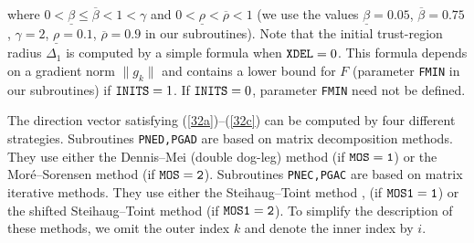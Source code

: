 \documentclass{esub2acm}
\begin{document}
%
where $0 < \underline{\beta} \leq \overline{\beta} < 1 < \gamma$
and $0 < \underline{\rho} < \overline{\rho} < 1$ (we use the values
$\underline{\beta} = 0.05$, $\overline{\beta} = 0.75$, $\gamma = 2$,
$\underline{\rho} = 0.1$, $\overline{\rho} = 0.9$ in our subroutines).
Note that the initial trust-region radius $\Delta_1$ is computed
by a simple formula when ${\tt XDEL} = 0$. This formula depends on
a gradient norm $\|g_k\|$ and contains a lower bound for $F$ (parameter
{\tt FMIN} in our subroutines) if ${\tt INITS}=1$. If ${\tt INITS}=0$,
parameter {\tt FMIN} need not be defined.

The direction vector satisfying (\ref{32a})--(\ref{32c}) can
be computed by four different strategies. Subroutines {\tt PNED,PGAD}
are based on matrix decomposition methods. They use either the
Dennis--Mei (double dog-leg) method \cite{dem1} (if ${\tt MOS=1}$)
or the Mor\'{e}--Sorensen method \cite{mos1} (if ${\tt MOS=2}$). Subroutines
{\tt PNEC,PGAC} are based on matrix iterative methods. They use either
the Steihaug--Toint method \cite{ste1}, \cite{toi1} (if ${\tt MOS1=1}$)
or %
the shifted Steihaug--Toint method \cite{lmv1} (if ${\tt MOS1=2}$).
To simplify the description of these methods, we omit the outer index
$k$ and denote the inner index by $i$.

\vspace{5mm}


\vspace{3mm}
\end{document}
